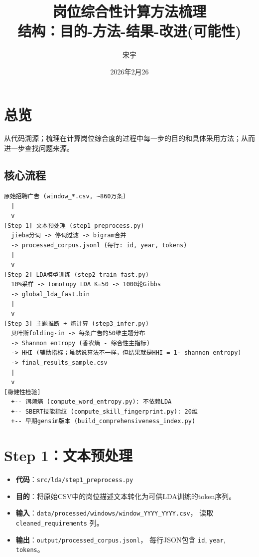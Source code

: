 \documentclass[12pt,a4paper]{ctexart}
\title{\textbf{岗位综合性计算方法梳理}\\[0.5em]
\large 结构：目的-方法-结果-改进(可能性)}
\author{宋宇}
\date{2026年2月26}
\begin{document}
\maketitle
\tableofcontents
\newpage


\section{总览}
\label{sec:overview}

从代码溯源；梳理在计算岗位综合度的过程中每一步的目的和具体采用方法；从而进一步查找问题来源。

\subsection{核心流程}

\begin{verbatim}
原始招聘广告 (window_*.csv, ~860万条)
  |
  v
[Step 1] 文本预处理 (step1_preprocess.py)
  jieba分词 -> 停词过滤 -> bigram合并
  -> processed_corpus.jsonl (每行: id, year, tokens)
  |
  v
[Step 2] LDA模型训练 (step2_train_fast.py)
  10%采样 -> tomotopy LDA K=50 -> 1000轮Gibbs
  -> global_lda_fast.bin
  |
  v
[Step 3] 主题推断 + 熵计算 (step3_infer.py)
  贝叶斯folding-in -> 每条广告的50维主题分布
  -> Shannon entropy (香农熵 - 综合性主指标)
  -> HHI (辅助指标；虽然说算法不一样，但结果就是HHI = 1- shannon entropy)
  -> final_results_sample.csv
  |
  v
[稳健性检验] 
  +-- 词频熵 (compute_word_entropy.py): 不依赖LDA
  +-- SBERT技能指纹 (compute_skill_fingerprint.py): 20维
  +-- 早期gensim版本 (build_comprehensiveness_index.py)
\end{verbatim}


\section{Step 1：文本预处理}
\label{sec:step1}

\begin{itemize}[leftmargin=2em]
\item \textbf{代码}：\texttt{src/lda/step1\_preprocess.py}
\item \textbf{目的}：将原始CSV中的岗位描述文本转化为可供LDA训练的token序列。
\item \textbf{输入}：\texttt{data/processed/windows/window\_YYYY\_YYYY.csv}，
读取 \texttt{cleaned\_requirements} 列。
\item \textbf{输出}：\texttt{output/processed\_corpus.jsonl}，
每行JSON包含 \texttt{id}, \texttt{year}, \texttt{tokens}。
\end{itemize}
\end{document}
